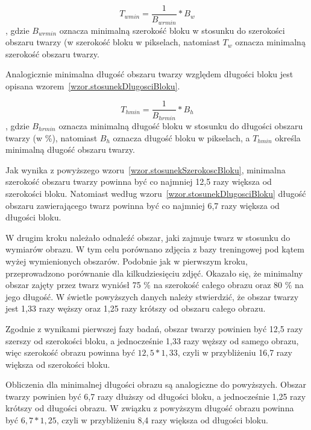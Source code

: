 \documentclass[a4paper,twoside,12pt]{book}
\begin{document}
    \large
    \begin{equation}
    T_{wmin}=\frac{1}{B_{wrmin}}*B_{w}
    \label{wzor.stosunekSzerokoscBloku}
    \end{equation}
    \normalsize
    , gdzie $B_{wrmin}$ oznacza minimalną szerokość bloku w stosunku do szerokości obszaru twarzy (w %
    szerokość bloku w pikselach, natomiast $T_{w}$ oznacza minimalną szerokość obszaru twarzy.

    Analogicznie minimalna długość obszaru twarzy względem długości bloku jest opisana
    wzorem~\ref{wzor.stosunekDlugosciBloku}.

    \large
    \begin{equation}
    T_{hmin}=\frac{1}{B_{hrmin}}*B_{h}
    \label{wzor.stosunekDlugosciBloku}
    \end{equation}
    \normalsize
    , gdzie $B_{hrmin}$ oznacza minimalną długość bloku w stosunku do długości obszaru twarzy (w \%), natomiast
    $B_{h}$ oznacza
    długość bloku w pikselach, a $T_{hmin}$ określa minimalną długość obszaru twarzy.

    Jak wynika z powyższego wzoru~\ref{wzor.stosunekSzerokoscBloku}, minimalna szerokość obszaru twarzy powinna
    być co najmniej 12,5 razy większa od szerokości bloku.
    Natomiast według wzoru~\ref{wzor.stosunekDlugosciBloku} długość obszaru zawierającego twarz powinna
    być co najmniej 6,7 razy większa od długości bloku.

    W drugim kroku należało odnaleźć obszar, jaki zajmuje twarz w stosunku do wymiarów obrazu.
    W tym celu porównano zdjęcia z bazy treningowej pod kątem wyżej wymienionych obszarów. Podobnie jak w pierwszym kroku, przeprowadzono porównanie dla
    kilkudziesięciu zdjęć.
    Okazało się, że minimalny obszar zajęty przez twarz wyniósł 75 \% na szerokość całego obrazu oraz 80 \% na jego długość.
    W świetle powyższych danych należy stwierdzić, że obszar twarzy jest 1,33 razy węższy oraz 1,25 razy krótszy od obszaru całego obrazu.

    Zgodnie z wynikami pierwszej fazy badań, obszar twarzy powinien być 12,5 razy szerszy od szerokości bloku,
    a jednocześnie 1,33 razy węższy od samego obrazu,
    więc szerokość obrazu powinna być $12,5*1,33$, czyli w przybliżeniu 16,7 razy większa od szerokości bloku.

    Obliczenia dla minimalnej długości obrazu są analogiczne do powyższych.
    Obszar twarzy powinien być 6,7 razy dłuższy od długości bloku, a jednocześnie 1,25 razy krótszy od długości obrazu.
    W związku z powyższym długość obrazu powinna być $6,7*1,25$, czyli w przybliżeniu 8,4 razy większa od długości bloku.
\end{document}
